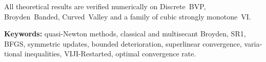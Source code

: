 \begin{otherlanguage}{english}
All theoretical results are verified numerically on Discrete~BVP,
Broyden~Banded, Curved~Valley and a family of cubic strongly monotone~VI.

\vspace{1em}\noindent
\textbf{Keywords:} quasi-Newton methods, classical and multisecant
Broyden, SR1, BFGS, symmetric updates, bounded deterioration,
superlinear convergence, variational inequalities, VIJI-Restarted,
optimal convergence rate.

\end{otherlanguage}
